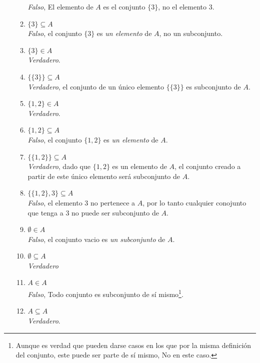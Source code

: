 \documentclass[a4paper,11pt]{article}
\begin{document}
\begin{enumerate}
\begin{enumerate}[label = \roman*)]
                \colorbox{g}{\textit{Falso}}, El elemento de $A$ es el conjunto $\{3\}$, no el elemento $3$.
            \item $\{3\} \subseteq A$\\
                \colorbox{g}{\textit{Falso}}, el conjunto $\{3\}$ es \textit{un elemento} de $A$, no un subconjunto.
            \item $\{3\} \in A$\\
                \colorbox{g}{\textit{Verdadero}}.
            \item $\{\{3\}\} \subseteq A$\\
                \colorbox{g}{\textit{Verdadero}}, el conjunto de un \'unico elemento $\{\{3\}\}$ es subconjunto de $A$.
            \item $\{1,2\} \in A$\\
                \colorbox{g}{\textit{Verdadero}}.
            \item $\{1,2\} \subseteq A$\\
                \colorbox{g}{\textit{Falso}}, el conjunto $\{1,2\}$ es \textit{un elemento} de $A$.
            \item $\{\{1,2\}\} \subseteq A$\\
                \colorbox{g}{\textit{Verdadero}}, dado que $\{1,2\}$ es un elemento de $A$, el conjunto creado a partir de este \'unico elemento ser\'a subconjunto de $A$.
            \item $\{\{1,2\},3\} \subseteq A$\\
                \colorbox{g}{\textit{Falso}}, el elemento $3$ no pertenece a $A$, por lo tanto cualquier conojunto que tenga a $3$ no puede ser subconjunto de $A$.
            \item $\emptyset \in A$\\
                \colorbox{g}{\textit{Falso}}, el conjunto vacio es \textit{un subconjunto} de $A$.
            \item $\emptyset \subseteq A$\\
                \colorbox{g}{\textit{Verdadero}}
            \item $A\in A$\\
                \colorbox{g}{\textit{Falso}}, Todo conjunto es subconjunto de s\'i mismo\footnote{Aunque es verdad que pueden darse casos en los que por la misma definici\'on del conjunto, este puede ser parte de s\'i mismo, No en este caso.}.
            \item $A\subseteq A$\\
                \colorbox{g}{\textit{Verdadero}}.

\end{enumerate}
\end{enumerate}
\end{document}
